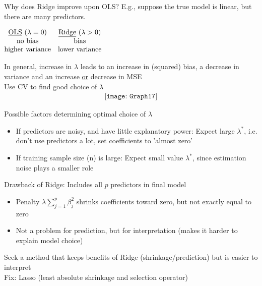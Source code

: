 \documentclass[11pt,a4paper,numbers=endperiod]{scrartcl}
\newcommand{\id}{\hspace*{4mm}}
\begin{document}
{Why does Ridge improve upon OLS? E.g., suppose the true model is linear, but there are many predictors.\\

\setlength\arraycolsep{25pt}
\begin{center}
	$\begin{matrix}
	\text{\underline{OLS} ($\lambda = 0$)} & \text{\underline{Ridge} ($\lambda > 0$)}\\
	\text{no bias} & \text{bias}\\
	\text{higher variance} & \text{lower variance}
	\end{matrix}$\\
\end{center}

In general, increase in $\lambda$ leads to an increase in (squared) bias, a decrease in variance and an increase \underline{or} decrease in MSE\\
\id {} Use CV to find good choice of $\lambda$
\begin{align*}
	\texttt{[image: Graph17]}
\end{align*}

Possible factors determining optimal choice of $\lambda$ \begin{itemize}
	\item If predictors are noisy, and have little explanatory power: Expect large $\lambda^*$, i.e. don't use predictors a lot, set coefficients to 'almost zero'
	\item If training sample size (n) is large: Expect small value $\lambda^*$, since estimation noise plays a smaller role
\end{itemize}

Drawback of Ridge: Includes all $p$ predictors in final model \begin{itemize}
	\item Penalty $\lambda \sum\limits_{j = 1}^p \beta_j^2$ shrinks coefficients toward zero, but not exactly equal to zero
	\item Not a problem for prediction, but for interpretation (makes it harder to explain model choice)
\end{itemize}

 Seek a method that keeps benefits of Ridge (shrinkage/prediction) but is easier to interpret\\
 Fix: Lasso (least absolute shrinkage and selection operator)\\

}
\end{document}
